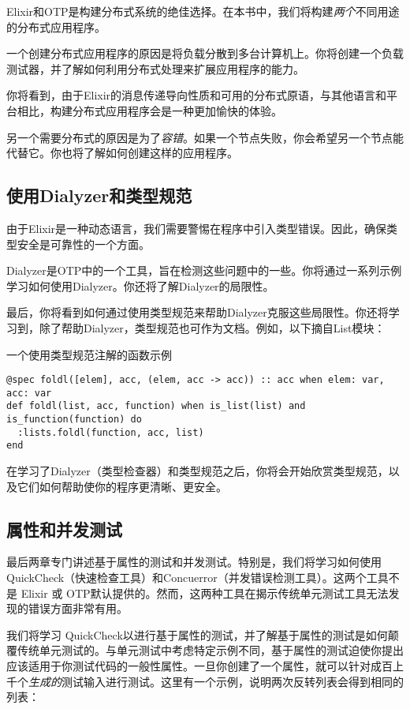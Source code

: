 Elixir和OTP是构建分布式系统的绝佳选择。在本书中，我们将构建\emph{两个}不同用途的分布式应用程序。

一个创建分布式应用程序的原因是将负载分散到多台计算机上。你将创建一个负载测试器，并了解如何利用分布式处理来扩展应用程序的能力。

你将看到，由于Elixir的消息传递导向性质和可用的分布式原语，与其他语言和平台相比，构建分布式应用程序会是一种更加愉快的体验。

另一个需要分布式的原因是为了\emph{容错}。如果一个节点失败，你会希望另一个节点能代替它。你也将了解如何创建这样的应用程序。

\subsection{使用Dialyzer和类型规范}

由于Elixir是一种动态语言，我们需要警惕在程序中引入类型错误。因此，确保类型安全是可靠性的一个方面。

Dialyzer是OTP中的一个工具，旨在检测这些问题中的一些。你将通过一系列示例学习如何使用Dialyzer。你还将了解Dialyzer的局限性。

最后，你将看到如何通过使用类型规范来帮助Dialyzer克服这些局限性。你还将学习到，除了帮助Dialyzer，类型规范也可作为文档。例如，以下摘自List模块：

\begin{code}{一个使用类型规范注解的函数示例}
\begin{verbatim}
@spec foldl([elem], acc, (elem, acc -> acc)) :: acc when elem: var, acc: var
def foldl(list, acc, function) when is_list(list) and is_function(function) do
  :lists.foldl(function, acc, list)
end
\end{verbatim}
\label{lst:list_docstr}
\end{code}

在学习了Dialyzer（类型检查器）和类型规范之后，你将会开始欣赏类型规范，以及它们如何帮助使你的程序更清晰、更安全。

\subsection{属性和并发测试}

最后两章专门讲述基于属性的测试和并发测试。特别是，我们将学习如何使用QuickCheck（快速检查工具）和Concuerror（并发错误检测工具）。这两个工具不是 Elixir 或 OTP默认提供的。然而，这两种工具在揭示传统单元测试工具无法发现的错误方面非常有用。

我们将学习 QuickCheck以进行基于属性的测试，并了解基于属性的测试是如何颠覆传统单元测试的。与单元测试中考虑特定示例不同，基于属性的测试迫使你提出应该适用于你测试代码的一般性属性。一旦你创建了一个属性，就可以针对成百上千个\emph{生成的}测试输入进行测试。这里有一个示例，说明两次反转列表会得到相同的列表：

